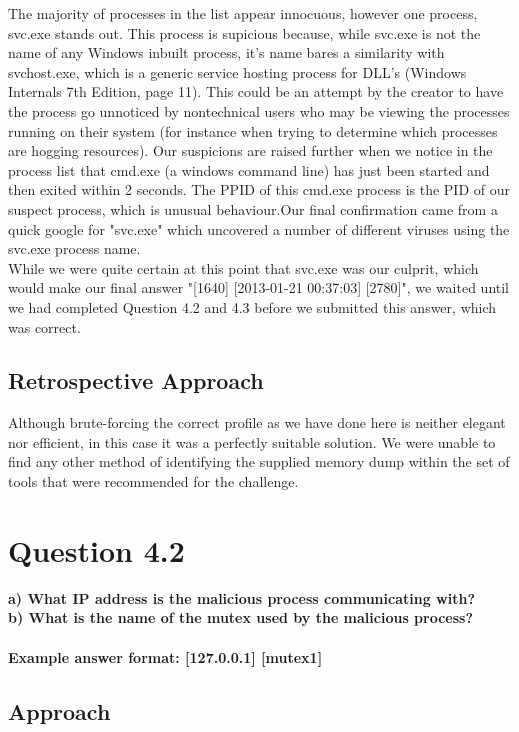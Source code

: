The majority of processes in the list appear innocuous, however one process, svc.exe stands out. This process is supicious because, while svc.exe is not the name of any Windows inbuilt process, it's name bares a similarity with svchost.exe, which is a generic service hosting process for DLL's (Windows Internals 7th Edition, page 11). This could be an attempt by the creator to have the process go unnoticed by nontechnical users who may be viewing the processes running on their system (for instance when trying to determine which processes are hogging resources). Our suspicions are raised further when we notice in the process list that cmd.exe (a windows command line) has just been started and then exited within 2 seconds. The PPID of this cmd.exe process is the PID of our suspect process, which is unusual behaviour.Our final confirmation came from a quick google for "svc.exe" which uncovered a number of different viruses using the svc.exe process name.\\
While we were quite certain at this point that svc.exe was our culprit, which would make our final answer "[1640] [2013-01-21 00:37:03] [2780]", we waited until we had completed Question 4.2 and 4.3 before we submitted this answer, which was correct.

\subsection{Retrospective Approach}
Although brute-forcing the correct profile as we have done here is neither elegant nor efficient, in this case it was a perfectly suitable solution. We were unable to find any other method of identifying the supplied memory dump within the set of tools that were recommended for the challenge.
\section{Question 4.2}
\textbf{a) What IP address is the malicious process communicating with?
\\b) What is the name of the mutex used by the malicious process?
\\\\
Example answer format: [127.0.0.1] [mutex1]}
\subsection{Approach}

